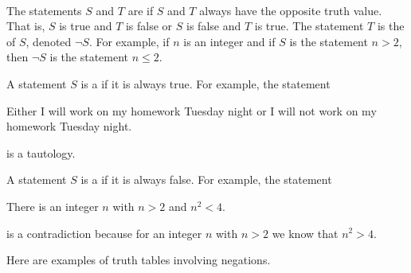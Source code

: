 \begin{defn}
\label{defn_negation_tautology_contradiction}
~
    \begin{apart}
        \item The statements $S$ and $T$ are  if $S$ and $T$ always have the opposite truth value. That is, $S$ is true and $T$ is false or $S$ is false and $T$ is true.  The statement $T$ is the  of $S$, denoted $\neg S$.  For example, if $n$ is an integer and if $S$ is the statement $n >2$, then $\neg S$ is the statement $n \le 2$.

        \item A statement $S$ is a  if it is always true.  For example, the statement 
            \begin{center}
                Either I will work on my homework Tuesday night or I will not work on my homework Tuesday night.   
            \end{center} 
        is a tautology.  

        \item A statement $S$ is a  if it is always false.  For example, the statement 
            \begin{center}
                There is an integer $n$ with $n>2$ and $n^2<4$.    
            \end{center} 
        is a contradiction because for an integer $n$ with $n>2$ we know that $n^2 > 4$. 
    \end{apart}   
\end{defn}

Here are examples of truth tables involving negations.

